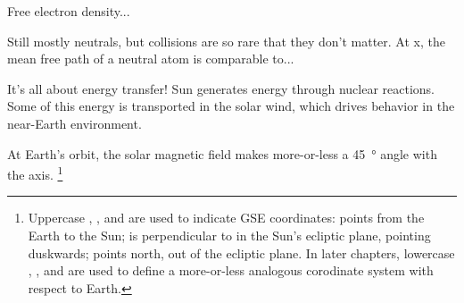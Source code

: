 Free electron density...

Still mostly neutrals, but collisions are so rare that they don't matter. At x, the mean free path of a neutral atom is comparable to... 





It's all about energy transfer! Sun generates energy through nuclear reactions. Some of this energy is transported in the solar wind, which drives behavior in the near-Earth environment. 


At Earth's orbit, the solar magnetic field makes more-or-less a \SI{45}{\degree} angle with the \X axis. 
\footnote{Uppercase \X, \Y, and \Z are used to indicate GSE coordinates: \X points from the Earth to the Sun; \Y is perpendicular to \X in the Sun's ecliptic plane, pointing duskwards; \Z points north, out of the ecliptic plane. In later chapters, lowercase \x, \y, and \z are used to define a more-or-less analogous corodinate system with respect to Earth. }




